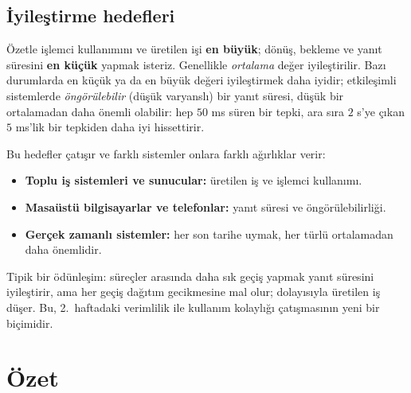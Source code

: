 \subsection{İyileştirme hedefleri}

Özetle işlemci kullanımını ve üretilen işi \textbf{en büyük}; dönüş, bekleme ve yanıt süresini \textbf{en küçük} yapmak isteriz. Genellikle \emph{ortalama} değer iyileştirilir. Bazı durumlarda en küçük ya da en büyük değeri iyileştirmek daha iyidir; etkileşimli sistemlerde \emph{öngörülebilir} (düşük varyanslı) bir yanıt süresi, düşük bir ortalamadan daha önemli olabilir: hep $50$ ms süren bir tepki, ara sıra $2$ s'ye çıkan $5$ ms'lik bir tepkiden daha iyi hissettirir.

Bu hedefler çatışır ve farklı sistemler onlara farklı ağırlıklar verir:
\begin{itemize}
  \item \textbf{Toplu iş sistemleri ve sunucular:} üretilen iş ve işlemci kullanımı.
  \item \textbf{Masaüstü bilgisayarlar ve telefonlar:} yanıt süresi ve öngörülebilirliği.
  \item \textbf{Gerçek zamanlı sistemler:} her son tarihe uymak, her türlü ortalamadan daha önemlidir.
\end{itemize}
Tipik bir ödünleşim: süreçler arasında daha sık geçiş yapmak yanıt süresini iyileştirir, ama her geçiş dağıtım gecikmesine mal olur; dolayısıyla üretilen iş düşer. Bu, 2.~haftadaki verimlilik ile kullanım kolaylığı çatışmasının yeni bir biçimidir.

\section{Özet}


